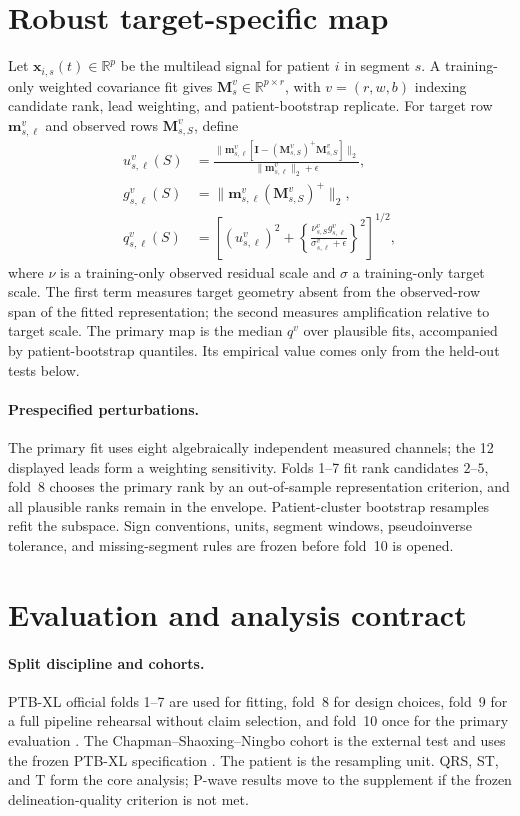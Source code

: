\documentclass[11pt]{article}
\begin{document}
\section{Robust target-specific map}
\label{sec:primary-method}
Let $\bm x_{i,s}(t)\in\mathbb R^p$ be the multilead signal for patient $i$ in segment $s$.  A
training-only weighted covariance fit gives $\bm M_s^v\in\mathbb R^{p\times r}$, with
$v=(r,w,b)$ indexing candidate rank, lead weighting, and patient-bootstrap replicate.  For target
row $\bm m_{s,\ell}^v$ and observed rows $\bm M_{s,S}^v$, define
\begin{align}
u_{s,\ell}^{v}(S)&=
\frac{\|\bm m_{s,\ell}^{v}[\bm I-(\bm M_{s,S}^{v})^+\bm M_{s,S}^{v}]\|_2}
{\|\bm m_{s,\ell}^{v}\|_2+\epsilon},\\
g_{s,\ell}^{v}(S)&=\|\bm m_{s,\ell}^{v}(\bm M_{s,S}^{v})^+\|_2,\\
q_{s,\ell}^{v}(S)&=
\left[(u_{s,\ell}^{v})^2+
\left\{\frac{\nu_{s,S}^{v}g_{s,\ell}^{v}}
{\sigma_{s,\ell}^{v}+\epsilon}\right\}^{2}\right]^{1/2},
\label{eq:robust-score-long}
\end{align}
where $\nu$ is a training-only observed residual scale and $\sigma$ a training-only target scale.
The first term measures target geometry absent from the observed-row span of the fitted
representation; the second measures amplification relative to target scale.  The primary map is the
median $q^v$ over plausible fits, accompanied by patient-bootstrap quantiles.  Its empirical value
comes only from the held-out tests below.

\paragraph{Prespecified perturbations.}
The primary fit uses eight algebraically independent measured channels; the 12 displayed leads form
a weighting sensitivity.  Folds 1--7 fit rank candidates $2$--$5$, fold~8 chooses the primary rank
by an out-of-sample representation criterion, and all plausible ranks remain in the envelope.
Patient-cluster bootstrap resamples refit the subspace.  Sign conventions, units, segment windows,
pseudoinverse tolerance, and missing-segment rules are frozen before fold~10 is opened.

\section{Evaluation and analysis contract}
\label{sec:primary-eval}
\paragraph{Split discipline and cohorts.}
PTB-XL official folds 1--7 are used for fitting, fold~8 for design choices, fold~9 for a full pipeline
rehearsal without claim selection, and fold~10 once for the primary evaluation
\cite{wagner2020ptbxl}.  The Chapman--Shaoxing--Ningbo cohort is the external test and uses the
frozen PTB-XL specification \cite{zheng2020chapman}.  The patient is the resampling unit.  QRS, ST,
and T form the core analysis; P-wave results move to the supplement if the frozen delineation-quality
criterion is not met.
\end{document}
